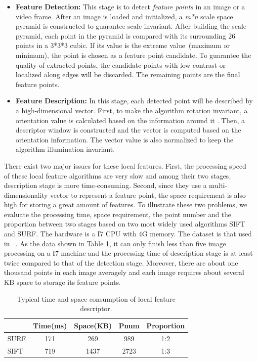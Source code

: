 \begin{itemize}
\setlength{\itemsep}{0mm}

\item \textbf{Feature Detection:} This stage is to detect \emph{feature points} in an image or a video frame. After an image is loaded and initialized, a \emph{m*n} scale space pyramid is constructed to guarantee scale invariant.  After building the scale pyramid, each point in the pyramid is compared with its surrounding 26 points in a 3*3*3 cubic. If its value is the extreme value~(maximum or minimum), the point is chosen as a feature point candidate. To guarantee the quality of extracted points, the candidate points with low contrast or localized along edges will be discarded. The remaining points are the final feature points.

\item \textbf{Feature Description:} In this stage, each detected point will be described by a high-dimensional vector. First, to make the algorithm rotation invariant, a orientation value is calculated based on the information around it . Then, a descriptor window is constructed and the vector is computed based on the orientation information. The vector value is also normalized to keep the algorithm illumination invariant.
\end{itemize}

There exist two major issues for these local features. First, the processing speed of these local feature algorithms are very slow and among their two stages, description stage is more time-consuming. Second, since they use a multi-dimensionality vector to represent a feature point, the space requirement is also high for storing a great amount of features. To illustrate these two problems, we evaluate the processing time, space requirement, the point number and the proportion between two stages based on two most widely used algorithms SIFT and SURF. The hardware is a I7 CPU with 4G memory. The dataset is that used in ~\cite{mikolajczyk2005performance}. As the data shown in Table \ref{tab:surfandsift}, it can only finish less than five image processing on a I7 machine and the processing time of description stage is at least twice compared to that of the detection stage. Moreover, there are about one thousand points in each image averagely and each image requires about several KB space to storage its feature points.

\begin{table}[!t]
\begin{center}
\begin{tabular}{|l|c|c|c|c|}
\hline
 & Time(ms) & Space(KB) & Pnum & Proportion \\
\hline
SURF & 171 & 269 & 989   &  1:2\\\hline
SIFT & 719 & 1437 & 2723 & 1:3 \\\hline
\end{tabular}
\end{center}
\caption{Typical time and space consumption of local feature descriptor.}
\label{tab:surfandsift}
\end{table}

